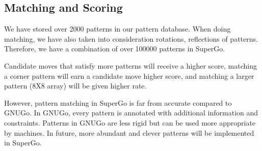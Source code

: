\subsection{Matching and Scoring}

We have stored over 2000 patterns in our pattern database. When doing matching, we have also taken into consideration rotations, reflections of patterns. Therefore, we have a combination of over 100000 patterns in SuperGo.

Candidate moves that satisfy more patterns will receive a higher score, matching a corner pattern will earn a candidate move higher score, and matching a larger pattern (8X8 array) will be given higher rate.

However, pattern matching in SuperGo is far from accurate compared to GNUGo. In GNUGo, every pattern is annotated with additional information and constraints. Patterns in GNUGo are less rigid but can be used more appropriate by machines. In future, more abundant and clever patterns will be implemented in SuperGo. 